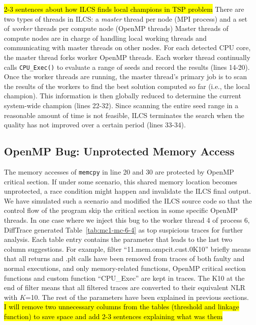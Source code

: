 \hl{2-3 sentences about how ILCS finds local champions in TSP problem}
There are two types of threads in ILCS: a \textit{master} thread per node (MPI process) and a set of \textit{worker} threads per compute node (OpenMP threads)
%
Master threads of compute nodes are in charge of handling local working threads and communicating with master threads on other nodes.
%
For each detected CPU core, the master thread forks worker OpenMP threads.
%
Each worker thread continually calls
\texttt{CPU\_Exec()} to evaluate a range of seeds and record the results (lines 14-20).
%
Once the worker threads are running, the master thread's primary job is to scan the results of the workers to find the best solution computed so far (i.e., the local champion). This information is then globally reduced to determine the current system-wide champion (lines 22-32).
%
Since scanning the entire seed range in a reasonable amount of time is not feasible, ILCS terminates the search when the quality has not improved over a certain period (lines 33-34).

\subsection{OpenMP Bug: Unprotected Memory Access}





The memory accesses of \texttt{memcpy} in line 20 and 30 are protected by OpenMP critical section.
%
If under some scenario, this shared memory location becomes unprotected, a race condition might happen and invalidate the ILCS final output.
%
We have simulated such a scenario and modified the ILCS source code so that the control flow of the program skip the critical section in some specific OpenMP threads.
%
In one case where we inject this bug to the worker thread 4 of process 6, DiffTrace generated Table~\ref{tab:mc1-mc-6-4} as top suspicious traces for further analysis.
%
Each table entry contains the parameter that leads to the last two column suggestions.
%
For example, filter ``11.mem.ompcit.cust.0K10'' briefly means that all returns and .plt calls have been removed from traces of both faulty and normal executions, and only memory-related functions, OpenMP critical section functions and custom function ``CPU\_Exec'' are kept in traces.
%
The K10 at the end of filter means that all filtered traces are converted to their equivalent NLR with $K$=10.
%
The rest of the parameters have been explained in previous sections.
%
\hl{I will remove two unnecessary columns from the tables (threshold and linkage function) to save space and add 2-3 sentences explaining what was them}

